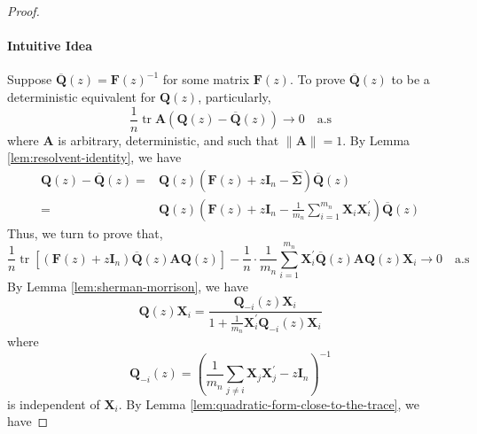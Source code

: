 \begin{proof}
    \paragraph*{Intuitive Idea}
    Suppose $\overline{\mathbf{Q}}(z)=\mathbf{F}(z)^{-1}$ for some matrix $\mathbf{F}(z)$. To prove $\overline{\mathbf{Q}}(z)$ to be a deterministic equivalent for $\mathbf{Q}(z)$, particularly,
    \begin{equation*}
        \frac{1}{n}\operatorname{tr}\mathbf{A}(\mathbf{Q}(z)-\overline{\mathbf{Q}}(z))\rightarrow 0\quad\text{a.s}
    \end{equation*}
    where $\mathbf{A}$ is arbitrary, deterministic, and such that $\|\mathbf{A}\|=1$. By Lemma \ref{lem:resolvent-identity}, we have
    \begin{equation*}
        \begin{aligned}
            \mathbf{Q}(z)-\overline{\mathbf{Q}}(z)= & \mathbf{Q}(z)\left(\mathbf{F}(z)+z\mathbf{I}_{n}-\widehat{\boldsymbol{\Sigma}}\right) \overline{\mathbf{Q}}(z)                                         \\
            =                                       & \mathbf{Q}(z)\left(\mathbf{F}(z)+z\mathbf{I}_{n}-\frac{1}{m_{n}}\sum_{i=1}^{m_{n}}\mathbf{X}_{i}\mathbf{X}_{i}^{\prime}\right)\overline{\mathbf{Q}}(z)
        \end{aligned}
    \end{equation*}
    Thus, we turn to prove that,
    \begin{equation*}
        \frac{1}{n}\operatorname{tr}\left[\left(\mathbf{F}(z)+z\mathbf{I}_{n}\right)\overline{\mathbf{Q}}(z)\mathbf{A}\mathbf{Q}(z)\right]-\frac{1}{n}\cdot\frac{1}{m_{n}}\sum_{i=1}^{m_{n}}\mathbf{X}_{i}^{\prime}\overline{\mathbf{Q}}(z)\mathbf{A}\mathbf{Q}(z)\mathbf{X}_{i}\rightarrow 0\quad\text{a.s}
    \end{equation*}
    By Lemma \ref{lem:sherman-morrison}, we have
    \begin{equation*}
        \mathbf{Q}(z)\mathbf{X}_{i}=\frac{\mathbf{Q}_{-i}(z)\mathbf{X}_{i}}{1+\frac{1}{m_{n}}\mathbf{X}_{i}^{\prime}\mathbf{Q}_{-i}(z)\mathbf{X}_{i}}
    \end{equation*}
    where
    \begin{equation*}
        \mathbf{Q}_{-i}(z)=\left(\frac{1}{m_{n}}\sum_{j\neq i}\mathbf{X}_{j}\mathbf{X}_{j}^{\prime}-z\mathbf{I}_{n}\right)^{-1}
    \end{equation*}
    is independent of $\mathbf{X}_{i}$. By Lemma \ref{lem:quadratic-form-close-to-the-trace}, we have

\end{proof}
